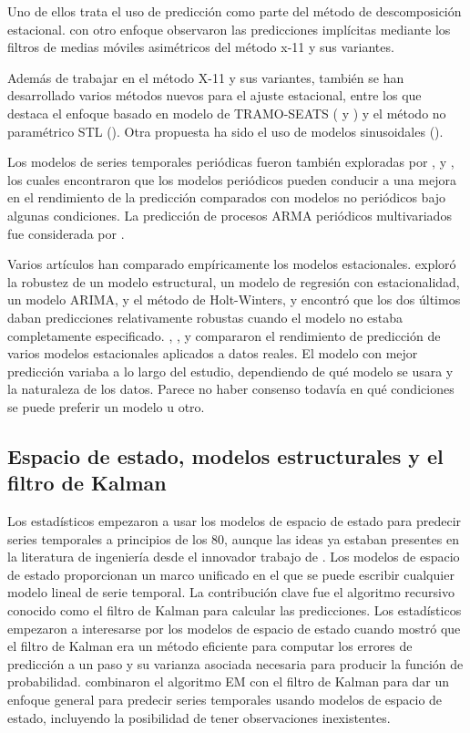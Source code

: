 \documentclass{llncs}
\begin{document}
Uno de ellos trata el uso de predicción como parte del método de descomposición estacional. \cite{Quenneville2003727} con otro enfoque observaron las predicciones implícitas mediante los filtros de medias móviles asimétricos del método x-11 y sus variantes. 

Además de trabajar en el método X-11 y sus variantes, también se han desarrollado varios métodos nuevos para el ajuste estacional, entre los que destaca el enfoque basado en modelo de TRAMO-SEATS (\cite{Gomez2001} y \cite{Kaiser2005691}) y el método no paramétrico STL (\cite{Cleveland19903}). Otra propuesta ha sido el uso de modelos sinusoidales (\cite{Simmons1990485}).

Los modelos de series temporales periódicas fueron también exploradas por \cite{Wells1997407}, \cite{Herwartz1997421} y \cite{Novales1997393}, los cuales encontraron que los modelos periódicos pueden conducir a una mejora en el rendimiento de la predicción comparados con modelos no periódicos bajo algunas condiciones. La predicción de procesos ARMA periódicos multivariados fue considerada por \cite{Ula1993645}.

Varios artículos han comparado empíricamente los modelos estacionales. \cite{Chen1997269} exploró la robustez de un modelo estructural, un modelo de regresión con estacionalidad, un modelo ARIMA, y el método de Holt-Winters, y encontró que los dos últimos daban predicciones relativamente robustas cuando el modelo no estaba completamente especificado. \cite{Noakes1985179}, \cite{Albertson1996345}, \cite{Kulendran1997319} y \cite{Franses200587} compararon el rendimiento de predicción de varios modelos estacionales aplicados a datos reales. El modelo con mejor predicción variaba a lo largo del estudio, dependiendo de qué modelo se usara y la naturaleza de los datos. Parece no haber consenso todavía en qué condiciones se puede preferir un modelo u otro.

\subsection{Espacio de estado, modelos estructurales y el filtro de Kalman}

Los estadísticos empezaron a usar los modelos de espacio de estado para predecir series temporales a principios de los 80, aunque las ideas ya estaban presentes en la literatura de ingeniería desde el innovador trabajo de \cite{Kalman196035}. Los modelos de espacio de estado proporcionan un marco unificado en el que se puede escribir cualquier modelo lineal de serie temporal. La contribución clave fue el algoritmo recursivo conocido como el filtro de Kalman para calcular las predicciones. Los estadísticos empezaron a interesarse por los modelos de espacio de estado cuando \cite{Schweppe196561} mostró que el filtro de Kalman era un método eficiente para computar los errores de predicción a un paso y su varianza asociada necesaria para producir la función de probabilidad. \cite{Shumway1982253} combinaron el algoritmo EM con el filtro de Kalman para dar un enfoque general para predecir series temporales usando modelos de espacio de estado, incluyendo la posibilidad de tener observaciones inexistentes.
\end{document}
